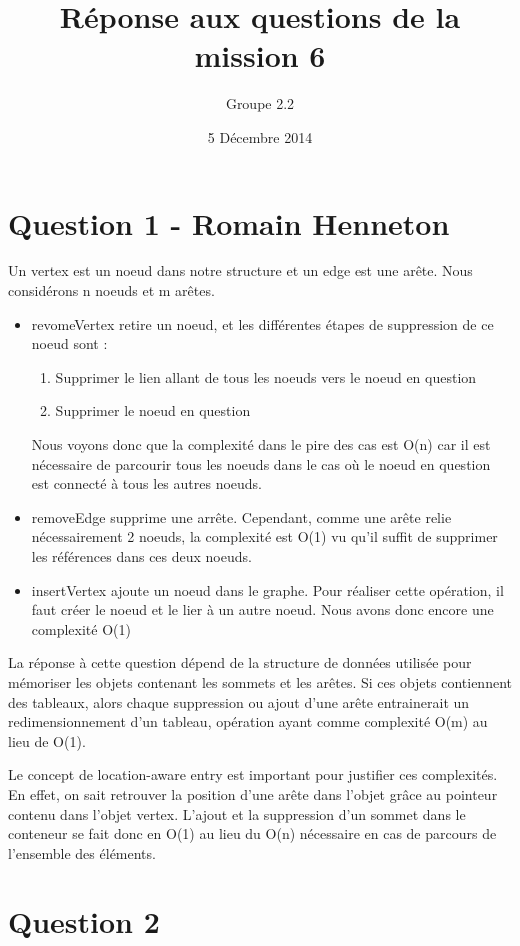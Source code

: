 \documentclass[10pt,a4paper]{article}
\date{5 Décembre 2014}
\author{Groupe 2.2}
\title{Réponse aux questions de la mission 6}
\begin{document}
\maketitle

\section*{Question 1 - Romain Henneton}
Un vertex est un noeud dans notre structure et un edge est une arête. Nous considérons n noeuds et m arêtes.
\begin{itemize}
\item revomeVertex retire un noeud, et les différentes étapes de suppression de ce noeud sont :
\begin{enumerate}
\item Supprimer le lien allant de tous les noeuds vers le noeud en question
\item Supprimer le noeud en question
\end{enumerate}
Nous voyons donc que la complexité dans le pire des cas est O(n) car il est nécessaire de parcourir tous les noeuds dans le cas où le noeud en question est connecté à tous les autres noeuds.
\item removeEdge supprime une arrête. Cependant, comme une arête relie nécessairement 2 noeuds, la complexité est O(1) vu qu'il suffit de supprimer les références dans ces deux noeuds.
\item insertVertex ajoute un noeud dans le graphe. Pour réaliser cette opération, il faut créer le noeud et le lier à un autre noeud. Nous avons donc encore une complexité O(1)
\end{itemize}

La réponse à cette question dépend de la structure de données utilisée pour mémoriser les objets contenant les sommets et les arêtes. Si ces objets contiennent des tableaux, alors chaque suppression ou ajout d'une arête entrainerait un redimensionnement d'un tableau, opération ayant comme complexité O(m) au lieu de O(1).

Le concept de location-aware entry est important pour justifier ces complexités. En effet, on sait retrouver la position d'une arête dans l'objet grâce au pointeur contenu dans l'objet vertex. L'ajout et la suppression d'un sommet dans le conteneur se fait donc en O(1) au lieu du O(n) nécessaire en cas de parcours de l'ensemble des éléments.
\section*{Question 2}
\end{document}

